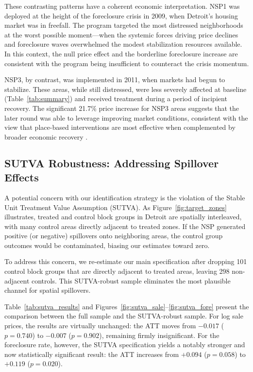 \documentclass[12pt,authoryear]{elsarticle}
\begin{document}
These contrasting patterns have a coherent economic interpretation. NSP1 was deployed at the height of the foreclosure crisis in 2009, when Detroit's housing market was in freefall. The program targeted the most distressed neighborhoods at the worst possible moment---when the systemic forces driving price declines and foreclosure waves overwhelmed the modest stabilization resources available. In this context, the null price effect and the borderline foreclosure increase are consistent with the program being insufficient to counteract the crisis momentum.

NSP3, by contrast, was implemented in 2011, when markets had begun to stabilize. These areas, while still distressed, were less severely affected at baseline (Table~\ref{tab:summary}) and received treatment during a period of incipient recovery. The significant 21.7\% price increase for NSP3 areas suggests that the later round was able to leverage improving market conditions, consistent with the view that place-based interventions are most effective when complemented by broader economic recovery \citep{kline2013}.

\subsection{SUTVA Robustness: Addressing Spillover Effects}
\label{subsec:sutva}

A potential concern with our identification strategy is the violation of the Stable Unit Treatment Value Assumption (SUTVA). As Figure~\ref{fig:target_zones} illustrates, treated and control block groups in Detroit are spatially interleaved, with many control areas directly adjacent to treated zones. If the NSP generated positive (or negative) spillovers onto neighboring areas, the control group outcomes would be contaminated, biasing our estimates toward zero.

To address this concern, we re-estimate our main specification after dropping 101 control block groups that are directly adjacent to treated areas, leaving 298 non-adjacent controls. This SUTVA-robust sample eliminates the most plausible channel for spatial spillovers.

Table~\ref{tab:sutva_results} and Figures~\ref{fig:sutva_sale}--\ref{fig:sutva_fore} present the comparison between the full sample and the SUTVA-robust sample. For log sale prices, the results are virtually unchanged: the ATT moves from $-0.017$ ($p = 0.740$) to $-0.007$ ($p = 0.902$), remaining firmly insignificant. For the foreclosure rate, however, the SUTVA specification yields a notably stronger and now statistically significant result: the ATT increases from $+0.094$ ($p = 0.058$) to $+0.119$ ($p = 0.020$).
\end{document}
